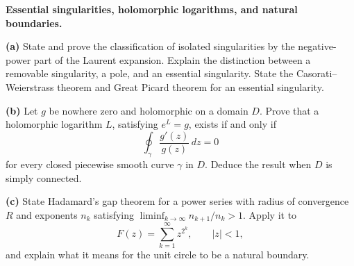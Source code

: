 \begin{problem}[CP-IV-0086]
\label{prob:cp-iv-0086}
\textbf{Essential singularities, holomorphic logarithms, and natural boundaries.}

\par\noindent\textbf{(a)} State and prove the classification of isolated
singularities by the negative-power part of the Laurent expansion.
Explain the distinction between a removable singularity, a pole, and an
essential singularity. State the Casorati--Weierstrass theorem and Great
Picard theorem for an essential singularity.

\par\noindent\textbf{(b)} Let $g$ be nowhere zero and holomorphic on a
domain $D$. Prove that a holomorphic logarithm $L$, satisfying $e^L=g$,
exists if and only if
\[
  \oint_\gamma\frac{g'(z)}{g(z)}\,dz=0
\]
for every closed piecewise smooth curve $\gamma$ in $D$. Deduce the result
when $D$ is simply connected.

\par\noindent\textbf{(c)} State Hadamard's gap theorem for a power series
with radius of convergence $R$ and exponents $n_k$ satisfying
$\liminf_{k\to\infty}n_{k+1}/n_k>1$. Apply it to
\[
  F(z)=\sum_{k=1}^{\infty}z^{2^k},\qquad |z|<1,
\]
and explain what it means for the unit circle to be a natural boundary.
\end{problem}



